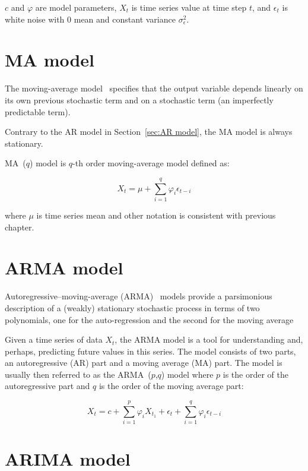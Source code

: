 $c$ and $\varphi$ are model parameters, $X_t$ is time series value at time step $t$, and $\epsilon_t$ is white noise with 0 mean and constant variance $\sigma_{\epsilon}^2$.

\section{MA model}
\label{sec:MA model}
The moving-average model~\autocite{tsa} specifies that the output variable depends linearly on its own previous stochastic term and on a stochastic term (an imperfectly predictable term).

Contrary to the AR model in Section~\ref{sec:AR model}, the MA model is always stationary.

MA~($q$) model is $q$-th order moving-average model defined as:

\begin{equation*}
  X_t = \mu + \sum_{i=1}^q{\varphi_i \epsilon_{t-i}}
\end{equation*}

where $\mu$ is time series mean and other notation is consistent with previous chapter.

\section{ARMA model}
\label{sec:ARMA model}

Autoregressive–moving-average (ARMA)~\autocite{tsa} models provide a parsimonious description of a (weakly) stationary stochastic process in terms of two polynomials, one for the auto-regression and the second for the moving average

Given a time series of data $X_t$, the ARMA model is a tool for understanding and, perhaps, predicting future values in this series. The model consists of two parts, an autoregressive (AR) part and a moving average (MA) part. The model is usually then referred to as the ARMA~($p$,$q$) model where $p$ is the order of the autoregressive part and $q$ is the order of the moving average part:

\begin{equation*}
  X_t = c + \sum_{i=1}^p{\varphi_i X_{t_1}} + \epsilon_t + \sum_{i=1}^q{\varphi_i \epsilon_{t-i}}
\end{equation*}


\section{ARIMA model}
\label{sec:ARIMA model}
